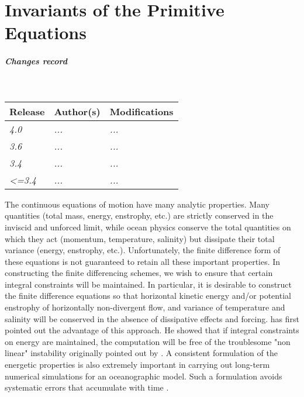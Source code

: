 \documentclass[../main/NEMO_manual]{subfiles}
\begin{document}
\chapter{Invariants of the Primitive Equations}
\label{chap:CONS}

\thispagestyle{plain}

\chaptertoc

\paragraph{Changes record} ~\\

{\footnotesize
  \begin{tabularx}{\textwidth}{l||X|X}
    Release & Author(s) & Modifications \\
    \hline
    {\em   4.0} & {\em ...} & {\em ...} \\
    {\em   3.6} & {\em ...} & {\em ...} \\
    {\em   3.4} & {\em ...} & {\em ...} \\
    {\em <=3.4} & {\em ...} & {\em ...}
  \end{tabularx}
}

\clearpage

The continuous equations of motion have many analytic properties.
Many quantities (total mass, energy, enstrophy, etc.) are strictly conserved in the inviscid and unforced limit,
while ocean physics conserve the total quantities on which they act (momentum, temperature, salinity) but
dissipate their total variance (energy, enstrophy, etc.).
Unfortunately, the finite difference form of these equations is not guaranteed to
retain all these important properties.
In constructing the finite differencing schemes, we wish to ensure that
certain integral constraints will be maintained.
In particular, it is desirable to construct the finite difference equations so that
horizontal kinetic energy and/or potential enstrophy of horizontally non-divergent flow,
and variance of temperature and salinity will be conserved in the absence of dissipative effects and forcing.
\citet{arakawa_JCP66} has first pointed out the advantage of this approach.
He showed that if integral constraints on energy are maintained,
the computation will be free of the troublesome "non linear" instability originally pointed out by
\citet{phillips_TAMS59}.
A consistent formulation of the energetic properties is also extremely important in carrying out
long-term numerical simulations for an oceanographic model.
Such a formulation avoids systematic errors that accumulate with time \citep{bryan_JCP97}.
\end{document}
